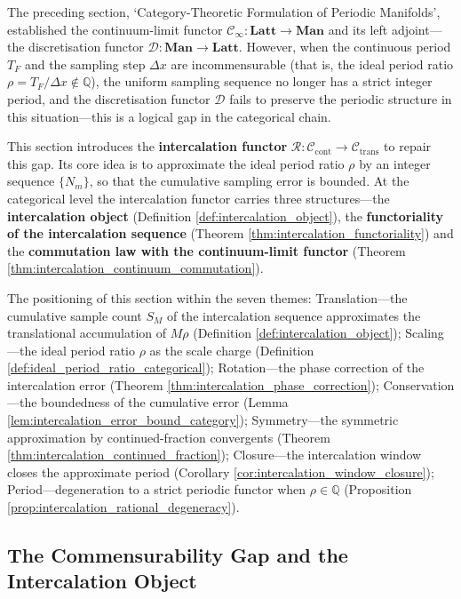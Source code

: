 \begin{remark}\label{rem:intercalation_functor_positioning}
The preceding section, `Category-Theoretic Formulation of Periodic Manifolds', established the continuum-limit functor $\mathcal{C}_\infty:\mathbf{Latt}\to\mathbf{Man}$ and its left adjoint---the discretisation functor $\mathcal{D}:\mathbf{Man}\to\mathbf{Latt}$. However, when the continuous period $T_F$ and the sampling step $\Delta x$ are incommensurable (that is, the ideal period ratio $\rho = T_F/\Delta x \notin \mathbb{Q}$), the uniform sampling sequence no longer has a strict integer period, and the discretisation functor $\mathcal{D}$ fails to preserve the periodic structure in this situation---this is a logical gap in the categorical chain.

This section introduces the \textbf{intercalation functor} $\mathcal{R}:\mathcal{C}_{\text{cont}}\to\mathcal{C}_{\text{trans}}$ to repair this gap. Its core idea is to approximate the ideal period ratio $\rho$ by an integer sequence $\{N_m\}$, so that the cumulative sampling error is bounded. At the categorical level the intercalation functor carries three structures---the \textbf{intercalation object} (Definition \ref{def:intercalation_object}), the \textbf{functoriality of the intercalation sequence} (Theorem \ref{thm:intercalation_functoriality}) and the \textbf{commutation law with the continuum-limit functor} (Theorem \ref{thm:intercalation_continuum_commutation}).

The positioning of this section within the seven themes: Translation---the cumulative sample count $S_M$ of the intercalation sequence approximates the translational accumulation of $M\rho$ (Definition \ref{def:intercalation_object}); Scaling---the ideal period ratio $\rho$ as the scale charge (Definition \ref{def:ideal_period_ratio_categorical}); Rotation---the phase correction of the intercalation error (Theorem \ref{thm:intercalation_phase_correction}); Conservation---the boundedness of the cumulative error (Lemma \ref{lem:intercalation_error_bound_category}); Symmetry---the symmetric approximation by continued-fraction convergents (Theorem \ref{thm:intercalation_continued_fraction}); Closure---the intercalation window closes the approximate period (Corollary \ref{cor:intercalation_window_closure}); Period---degeneration to a strict periodic functor when $\rho \in \mathbb{Q}$ (Proposition \ref{prop:intercalation_rational_degeneracy}).
\end{remark}

\subsection{The Commensurability Gap and the Intercalation Object}

